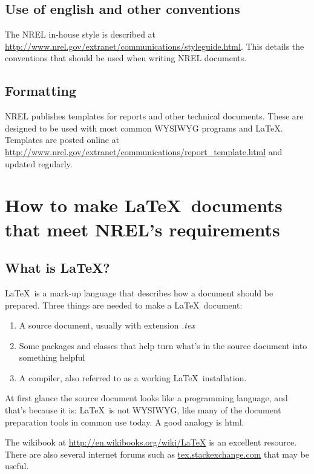 \documentclass[12pt,letterpaper]{report}
\begin{document}
\section{Use of english and other conventions}
The NREL in-house style is described at \url{http://www.nrel.gov/extranet/communications/styleguide.html}. This details the conventions that should be used when writing NREL documents.

\section{Formatting}
NREL publishes templates for reports and other technical documents. These are designed to be used with most common WYSIWYG programs and \LaTeX{}. Templates are posted online at \url{http://www.nrel.gov/extranet/communications/report_template.html} and updated regularly. 


\chapter{How to make \LaTeX\ documents that meet NREL's requirements}

\section{What is \LaTeX?}
\label{sec:examples}

\LaTeX\ is a mark-up language that describes how a document should be prepared. Three things are needed to make a \LaTeX\ document:
\begin{enumerate}
\item A source document, usually with extension \emph{.tex}
\item Some packages and classes that help turn what's in the source document into something helpful
\item A compiler, also referred to as a working \LaTeX\ installation.
\end{enumerate}

At first glance the source document looks like a programming language, and that's because it is: \LaTeX\ is not WYSIWYG, like many of the document preparation tools in common use today. A good analogy is html.

The wikibook at \url{http://en.wikibooks.org/wiki/LaTeX} is an excellent resource. There are also several internet forums such as \url{tex.stackexchange.com} that may be useful.
\end{document}
